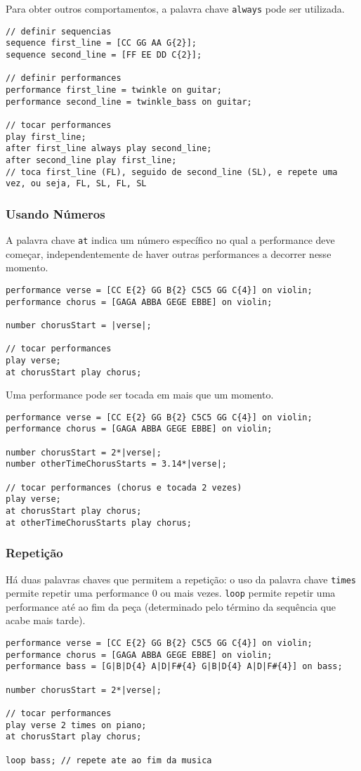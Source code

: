 \documentclass{article}
\begin{document}
Para obter outros comportamentos, a palavra chave \texttt{always} pode ser utilizada.

\begin{lstlisting} 
// definir sequencias
sequence first_line = [CC GG AA G{2}];
sequence second_line = [FF EE DD C{2}];

// definir performances
performance first_line = twinkle on guitar;
performance second_line = twinkle_bass on guitar;

// tocar performances
play first_line;
after first_line always play second_line;
after second_line play first_line;
// toca first_line (FL), seguido de second_line (SL), e repete uma vez, ou seja, FL, SL, FL, SL
\end{lstlisting}

\subsubsection{Usando Números}
A palavra chave \texttt{at} indica um número específico no qual a performance deve começar, independentemente de haver outras performances a decorrer nesse momento. 
\begin{lstlisting} 
performance verse = [CC E{2} GG B{2} C5C5 GG C{4}] on violin;
performance chorus = [GAGA ABBA GEGE EBBE] on violin;

number chorusStart = |verse|;

// tocar performances
play verse;
at chorusStart play chorus;
\end{lstlisting}

Uma performance pode ser tocada em mais que um momento.
\begin{lstlisting} 
performance verse = [CC E{2} GG B{2} C5C5 GG C{4}] on violin;
performance chorus = [GAGA ABBA GEGE EBBE] on violin;

number chorusStart = 2*|verse|;
number otherTimeChorusStarts = 3.14*|verse|;

// tocar performances (chorus e tocada 2 vezes)
play verse;
at chorusStart play chorus;
at otherTimeChorusStarts play chorus;
\end{lstlisting}

\subsubsection{Repetição}
Há duas palavras chaves que permitem a repetição: o uso da palavra chave \texttt{times} permite repetir uma performance 0 ou mais vezes. \texttt{loop} permite repetir uma performance até ao fim da peça (determinado pelo término da sequência que acabe mais tarde).
\begin{lstlisting} 
performance verse = [CC E{2} GG B{2} C5C5 GG C{4}] on violin;
performance chorus = [GAGA ABBA GEGE EBBE] on violin;
performance bass = [G|B|D{4} A|D|F#{4} G|B|D{4} A|D|F#{4}] on bass;

number chorusStart = 2*|verse|;

// tocar performances
play verse 2 times on piano;
at chorusStart play chorus;

loop bass; // repete ate ao fim da musica
\end{lstlisting}
\end{document}
